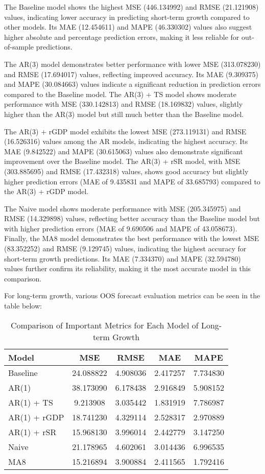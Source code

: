 \documentclass[12pt]{article}
\begin{document}
The Baseline model shows the highest MSE (446.134992) and RMSE (21.121908) values, indicating lower accuracy in predicting short-term growth compared to other models. Its MAE (12.454611) and MAPE (46.330302) values also suggest higher absolute and percentage prediction errors, making it less reliable for out-of-sample predictions.

The AR(3) model demonstrates better performance with lower MSE (313.078230) and RMSE (17.694017) values, reflecting improved accuracy. Its MAE (9.309375) and MAPE (30.084663) values indicate a significant reduction in prediction errors compared to the Baseline model. The AR(3) + TS model shows moderate performance with MSE (330.142813) and RMSE (18.169832) values, slightly higher than the AR(3) model but still much better than the Baseline model.

The AR(3) + rGDP model exhibits the lowest MSE (273.119131) and RMSE (16.526316) values among the AR models, indicating the highest accuracy. Its MAE (9.842522) and MAPE (30.615063) values also demonstrate significant improvement over the Baseline model. The AR(3) + rSR model, with MSE (303.885695) and RMSE (17.432318) values, shows good accuracy but slightly higher prediction errors (MAE of 9.435831 and MAPE of 33.685793) compared to the AR(3) + rGDP model.

The Naive model shows moderate performance with MSE (205.345975) and RMSE (14.329898) values, reflecting better accuracy than the Baseline model but with higher prediction errors (MAE of 9.690506 and MAPE of 43.058673). Finally, the MA8 model demonstrates the best performance with the lowest MSE (83.352252) and RMSE (9.129745) values, indicating the highest accuracy for short-term growth predictions. Its MAE (7.334370) and MAPE (32.594780) values further confirm its reliability, making it the most accurate model in this comparison.


For long-term growth, various OOS forecast evaluation metrics can be seen in the table below:

\begin{table}[H]
\centering
\begin{tabular}{lcccc}
\hline
Model & MSE & RMSE & MAE & MAPE \\
\hline
Baseline & 24.088822 & 4.908036 & 2.417257 & 7.734830 \\
AR(1) & 38.173090 & 6.178438 & 2.916849 & 5.908152 \\
AR(1) + TS & 9.213908 & 3.035442 & 1.831919 & 7.786987 \\
AR(1) + rGDP & 18.741230 & 4.329114 & 2.528317 & 2.970889 \\
AR(1) + rSR & 15.968130 & 3.996014 & 2.442779 & 3.147250 \\
Naive & 21.178965 & 4.602061 & 3.014436 & 6.996535 \\
MA8 & 15.216894 & 3.900884 & 2.411565 & 1.792416 \\
\hline
\end{tabular}
\caption{Comparison of Important Metrics for Each Model of Long-term Growth}
\label{tab:model_comparison_lt}
\end{table}
\end{document}
